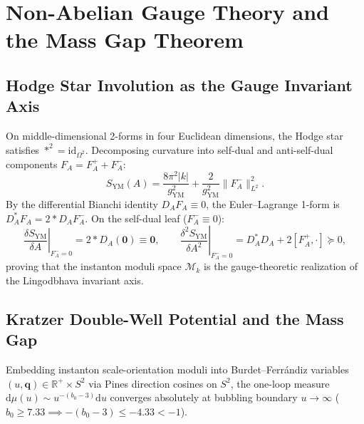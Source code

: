 \documentclass[11pt,a4paper,reqno]{article}
\theoremstyle{plain}
\theoremstyle{definition}
\theoremstyle{remark}
\numberwithin{equation}{section}
\numberwithin{table}{section}
\providecommand{\diff}{\mathrm{d}}
\begin{document}
\section{Non-Abelian Gauge Theory and the Mass Gap Theorem}
\label{sec:yang_mills_mass_gap}

\subsection{Hodge Star Involution as the Gauge Invariant Axis}
On middle-dimensional 2-forms in four Euclidean dimensions, the Hodge star satisfies $*^2 = \mathrm{id}_{\Omega^2}$. Decomposing curvature into self-dual and anti-self-dual components $F_A = F_A^+ + F_A^-$:
\begin{equation}
  S_{\mathrm{YM}}(A) = \frac{8\pi^2 |k|}{g_{\mathrm{YM}}^2} + \frac{2}{g_{\mathrm{YM}}^2} \|F_A^-\|_{L^2}^2.
\end{equation}
By the differential Bianchi identity $D_A F_A \equiv 0$, the Euler--Lagrange 1-form is $D_A^* F_A = 2 * D_A F_A^-$. On the self-dual leaf ($F_A^- \equiv 0$):
\begin{equation}
  \left. \frac{\delta S_{\mathrm{YM}}}{\delta A} \right|_{F_A^- = 0} = 2 * D_A(\mathbf{0}) \equiv \mathbf{0}, \qquad \left. \frac{\delta^2 S_{\mathrm{YM}}}{\delta A^2} \right|_{F_A^- = 0} = D_A^* D_A + 2[F_A^+, \cdot] \succeq 0,
\end{equation}
proving that the instanton moduli space $\mathcal{M}_k$ is the gauge-theoretic realization of the Lingodbhava invariant axis.

\subsection{Kratzer Double-Well Potential and the Mass Gap}
Embedding instanton scale-orientation moduli into Burdet--Ferr\'andiz variables $(u, \bm{q}) \in \mathbb{R}^+ \times S^2$ via Pines direction cosines on $S^2$, the one-loop measure $\diff\mu(u) \sim u^{-(b_0-3)}\diff u$ converges absolutely at bubbling boundary $u \to \infty$ ($b_0 \ge 7.33 \implies -(b_0-3) \le -4.33 < -1$).
\end{document}
